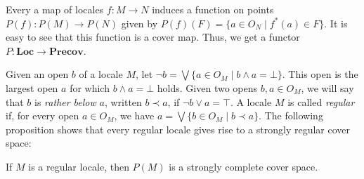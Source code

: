 \documentclass[reqno]{amsart}
\theoremstyle{definition}
\theoremstyle{remark}
\numberwithin{figure}{section}
\newcommand{\rb}{\prec}
\newcommand{\cat}[1]{\mathbf{#1}}
\begin{document}
Every a map of locales $f : M \to N$ induces a function on points $P(f) : P(M) \to P(N)$ given by $P(f)(F) = \{ a \in O_N \mid f^*(a) \in F \}$.
It is easy to see that this function is a cover map.
Thus, we get a functor $P : \cat{Loc} \to \cat{Precov}$.

Given an open $b$ of a locale $M$, let $\neg b = \bigvee \{ a \in O_M \mid b \wedge a = \bot \}$.
This open is the largest open $a$ for which $b \wedge a = \bot$ holds.
Given two opens $b,a \in O_M$, we will say that $b$ is \emph{rather below} $a$, written $b \rb a$, if $\neg b \vee a = \top$.
A locale $M$ is called \emph{regular} if, for every open $a \in O_M$, we have $a = \bigvee \{ b \in O_M \mid b \rb a \}$.
The following proposition shows that every regular locale gives rise to a strongly regular cover space:

\begin{prop}
If $M$ is a regular locale, then $P(M)$ is a strongly complete cover space.
\end{prop}
\end{document}
